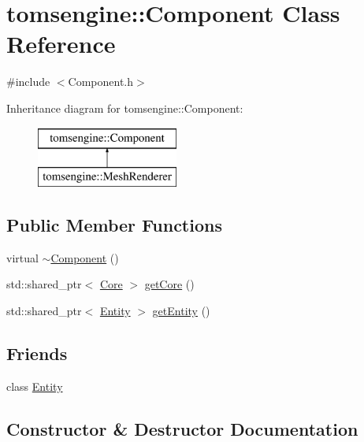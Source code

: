 \hypertarget{classtomsengine_1_1_component}{}\section{tomsengine\+:\+:Component Class Reference}
\label{classtomsengine_1_1_component}


{\ttfamily \#include $<$Component.\+h$>$}

Inheritance diagram for tomsengine\+:\+:Component\+:\begin{figure}[H]
\begin{center}
\leavevmode
\includegraphics[height=2.000000cm]{classtomsengine_1_1_component}
\end{center}
\end{figure}
\subsection*{Public Member Functions}
\begin{DoxyCompactItemize}
\item 
virtual \mbox{\hyperlink{classtomsengine_1_1_component_a76e5a26860d666c9290057a140517f7e}{$\sim$\+Component}} ()
\item 
std\+::shared\+\_\+ptr$<$ \mbox{\hyperlink{classtomsengine_1_1_core}{Core}} $>$ \mbox{\hyperlink{classtomsengine_1_1_component_a377e917bf99c007b30ff12ceedd666ee}{get\+Core}} ()
\item 
std\+::shared\+\_\+ptr$<$ \mbox{\hyperlink{classtomsengine_1_1_entity}{Entity}} $>$ \mbox{\hyperlink{classtomsengine_1_1_component_a7091b67f11bc3b64db3d913e255a7840}{get\+Entity}} ()
\end{DoxyCompactItemize}
\subsection*{Friends}
\begin{DoxyCompactItemize}
\item 
class \mbox{\hyperlink{classtomsengine_1_1_component_a614439ccac0344926adc4c0165d64060}{Entity}}
\end{DoxyCompactItemize}


\subsection{Constructor \& Destructor Documentation}
\mbox{\label{classtomsengine_1_1_component_a76e5a26860d666c9290057a140517f7e}} 
